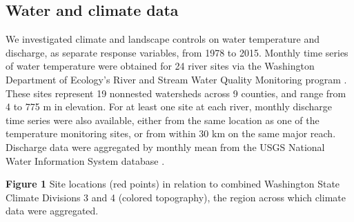\documentclass[notitlepage]{article}
\begin{document}
\subsection*{Water and climate data}

We investigated climate and landscape controls on water temperature and discharge, as separate response variables, from 1978 to 2015. Monthly time series of water temperature were obtained for 24 river sites via the Washington Department of Ecology's River and Stream Water Quality Monitoring program \citep{DoEwaterData}. These sites represent 19 nonnested watersheds across 9 counties, and range from 4 to 775 m in elevation. For at least one site at each river, monthly discharge time series were also available, either from the same location as one of the temperature monitoring sites, or from within 30 km on the same major reach. Discharge data were aggregated by monthly mean from the USGS National Water Information System database \citep{USGSdischarge}.

\begin{center}
\textbf{Figure 1} Site locations (red points) in relation to combined Washington State Climate Divisions 3 and 4 (colored topography), the region across which climate data were aggregated.
\end{center}
\end{document}
